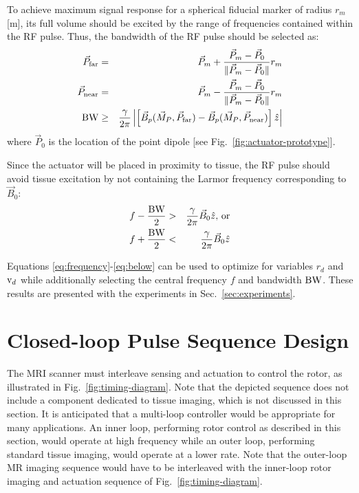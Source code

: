 \documentclass[journal]{IEEEtran}
\newcommand{\norm}[1]{\lVert#1\rVert}
\begin{document}
To achieve maximum signal response for a spherical fiducial marker of radius $r_m$ [m], its full volume should be excited by the range of frequencies contained within the RF pulse. Thus, the bandwidth of the RF pulse should be selected as:
\begin{eqnarray}
	\vec{P}_\textnormal{far} & = & \vec{P}_m + \dfrac{\vec{P}_m - \vec{P}_0}{\norm{\vec{P}_m - \vec{P}_0}}r_m \\
	\vec{P}_\textnormal{near} & = & \vec{P}_m - \dfrac{\vec{P}_m - \vec{P}_0}{\norm{\vec{P}_m - \vec{P}_0}}r_m \\
	\textnormal{BW} & \ge & \dfrac{\gamma}{2\pi}\left\lvert\left[\vec{B}_p(\vec{M}_P, \vec{P}_\textnormal{far}) - \vec{B}_p(\vec{M}_P, \vec{P}_\textnormal{near})\right]\hat{z}\right\rvert
\label{eq:bandwidth}
\end{eqnarray}
where $\vec{P}_0$ is the location of the point dipole [see Fig.\ \ref{fig:actuator-prototype}].

Since the actuator will be placed in proximity to tissue, the RF pulse should avoid tissue excitation by not containing the Larmor frequency corresponding to $\vec{B}_0$:
\begin{eqnarray}
	f - \dfrac{\textnormal{BW}}{2} & > & \dfrac{\gamma}{2\pi}\vec{B}_0\hat{z}\textnormal{, or} \label {eq:above}\\
	f + \dfrac{\textnormal{BW}}{2} & < & \dfrac{\gamma}{2\pi}\vec{B}_0\hat{z} \label{eq:below}
\end{eqnarray}

Equations \eqref{eq:frequency}-\eqref{eq:below} can be used to optimize for variables $r_d$ and $\textnormal{v}_d$ while additionally selecting the central frequency $f$ and bandwidth $\textnormal{BW}$. These results are presented with the experiments in Sec.\ \ref{sec:experiments}.

\section{Closed-loop Pulse Sequence Design}
\label{sec:gradient-control}

The MRI scanner must interleave sensing and actuation to control the rotor, as illustrated in Fig.\ \ref{fig:timing-diagram}. Note that the depicted sequence does not include a component dedicated to tissue imaging, which is not discussed in this section. It is anticipated that a multi-loop controller would be appropriate for many applications. An inner loop, performing rotor control as described in this section, would operate at high frequency while an outer loop, performing standard tissue imaging, would operate at a lower rate. Note that the outer-loop MR imaging sequence would have to be interleaved with the inner-loop rotor imaging and actuation sequence of Fig.\ \ref{fig:timing-diagram}.
\end{document}
